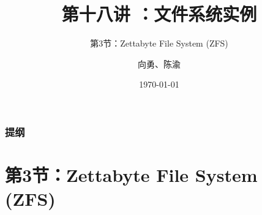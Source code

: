 


\title[第18讲]{第十八讲 ：文件系统实例} %
\subtitle{第3节：Zettabyte File System (ZFS)}
\author{向勇、陈渝} %
\date{\today} %



\begin{frame}
\titlepage %
\end{frame}

\begin{frame}
\frametitle{提纲} %
\tableofcontents %

\end{frame}
\section{第3节：Zettabyte File System (ZFS)} %
